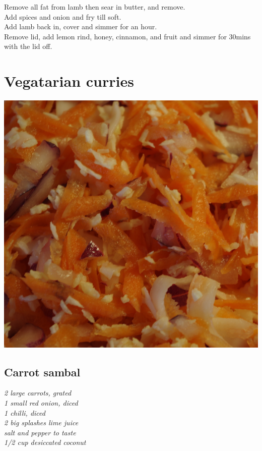 \documentclass{tufte-book}
\begin{document}
Remove all fat from lamb then sear in butter, and remove.
\\Add spices and onion and fry till soft.
\\Add lamb back in, cover and simmer for an hour.
\\Remove lid, add lemon rind, honey, cinnamon, and fruit and simmer for 30mins with the lid off.


\chapter{Vegatarian curries}


\begin{marginfigure}%
  \includegraphics[width=\linewidth]{carrotraita.png}
\end{marginfigure}

\section{Carrot sambal}
\emph{2 large carrots, grated
\\1 small red onion, diced
\\1 chilli, diced
\\2 big splashes lime juice
\\salt and pepper to taste
\\1/2 cup desiccated coconut}
\end{document}
